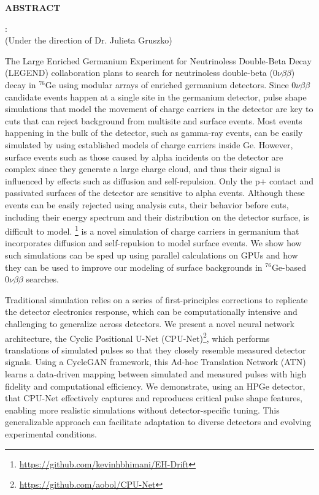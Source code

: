 \begin{center}
\vspace*{52pt}
{\normalfont\textbf{ABSTRACT}}
\vspace{11pt}

\begin{singlespace}
{\authorname}: {\thesistitle}\\
(Under the direction of Dr. Julieta Gruszko)
\end{singlespace}
\end{center}

The Large Enriched Germanium Experiment for Neutrinoless Double-Beta Decay (LEGEND) collaboration plans to search for neutrinoless double-beta ($0\nu\beta\beta$) decay in ${}^{76}$Ge using modular arrays of enriched germanium detectors. Since $0\nu\beta\beta$ candidate events happen at a single site in the germanium detector, pulse shape simulations that model the movement of charge carriers in the detector are key to cuts that can reject background from multisite and surface events. Most events happening in the bulk of the detector, such as gamma-ray events, can be easily simulated by using established models of charge carriers inside Ge. However, surface events such as those caused by alpha incidents on the detector are complex since they generate a large charge cloud, and thus their signal is influenced by effects such as diffusion and self-repulsion. Only the p+ contact and passivated surfaces of the detector are sensitive to alpha events. Although these events can be easily rejected using analysis cuts, their behavior before cuts, including their energy spectrum and their distribution on the detector surface, is difficult to model. {\ehd} \footnote{\url{https://github.com/kevinhbhimani/EH-Drift}} is a novel simulation of charge carriers in germanium that incorporates diffusion and self-repulsion to model surface events. We show how such simulations can be sped up using parallel calculations on GPUs and how they can be used to improve our modeling of surface backgrounds in ${}^{76}$Ge-based $0\nu\beta\beta$ searches.

Traditional simulation relies on a series of first-principles corrections to replicate the detector electronics response, which can be computationally intensive and challenging to generalize across detectors. We present a novel neural network architecture, the Cyclic Positional U-Net (CPU-Net)\footnote{\url{https://github.com/aobol/CPU-Net}}, which performs translations of simulated pulses so that they closely resemble measured detector signals. Using a CycleGAN framework, this Ad-hoc Translation Network (ATN) learns a data-driven mapping between simulated and measured pulses with high fidelity and computational efficiency. We demonstrate, using an HPGe detector, that CPU-Net effectively captures and reproduces critical pulse shape features, enabling more realistic simulations without detector-specific tuning. This generalizable approach can facilitate adaptation to diverse detectors and evolving experimental conditions.

\clearpage
